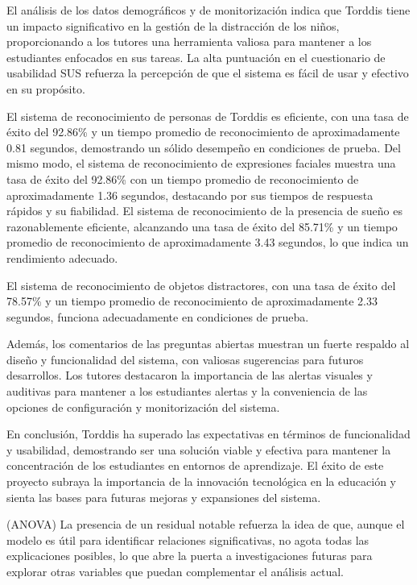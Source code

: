 \documentclass[a4paper,fleqn]{cas-sc}
\begin{document}
		El análisis de los datos demográficos y de monitorización indica que Torddis tiene un impacto significativo en la gestión de la distracción de los niños, proporcionando a los tutores una herramienta valiosa para mantener a los estudiantes enfocados en sus tareas. La alta puntuación en el cuestionario de usabilidad SUS refuerza la percepción de que el sistema es fácil de usar y efectivo en su propósito.
		
		El sistema de reconocimiento de personas de Torddis es eficiente, con una tasa de éxito del 92.86\% y un tiempo promedio de reconocimiento de aproximadamente 0.81 segundos, demostrando un sólido desempeño en condiciones de prueba. Del mismo modo, el sistema de reconocimiento de expresiones faciales muestra una tasa de éxito del 92.86\% con un tiempo promedio de reconocimiento de aproximadamente 1.36 segundos, destacando por sus tiempos de respuesta rápidos y su fiabilidad. El sistema de reconocimiento de la presencia de sueño es razonablemente eficiente, alcanzando una tasa de éxito del 85.71\% y un tiempo promedio de reconocimiento de aproximadamente 3.43 segundos, lo que indica un rendimiento adecuado.
		
		El sistema de reconocimiento de objetos distractores, con una tasa de éxito del 78.57\% y un tiempo promedio de reconocimiento de aproximadamente 2.33 segundos, funciona adecuadamente en condiciones de prueba.
		
		Además, los comentarios de las preguntas abiertas muestran un fuerte respaldo al diseño y funcionalidad del sistema, con valiosas sugerencias para futuros desarrollos. Los tutores destacaron la importancia de las alertas visuales y auditivas para mantener a los estudiantes alertas y la conveniencia de las opciones de configuración y monitorización del sistema.
		
		En conclusión, Torddis ha superado las expectativas en términos de funcionalidad y usabilidad, demostrando ser una solución viable y efectiva para mantener la concentración de los estudiantes en entornos de aprendizaje. El éxito de este proyecto subraya la importancia de la innovación tecnológica en la educación y sienta las bases para futuras mejoras y expansiones del sistema.
	
		(ANOVA) La presencia de un residual notable refuerza la idea de que, aunque el modelo es útil para identificar relaciones significativas, no agota todas las explicaciones posibles, lo que abre la puerta a investigaciones futuras para explorar otras variables que puedan complementar el análisis actual.
		
\end{document}
